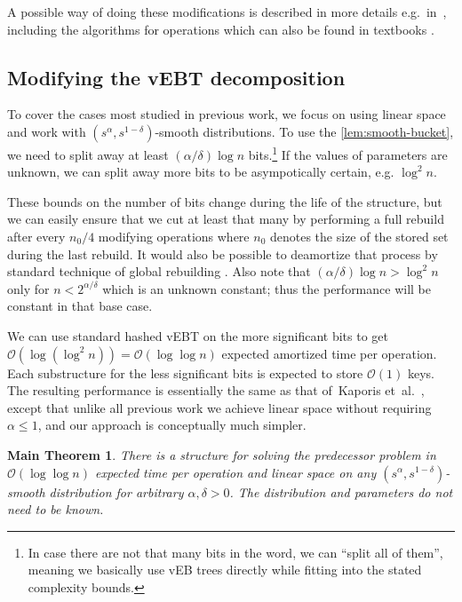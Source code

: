 \documentclass[
submission
]{dmtcs-episciences}
\theoremstyle{plain}
\theoremstyle{definition}
\theoremstyle{remark}
\theoremstyle{plain}
\theoremstyle{plain}
\newtheorem*{thm*}{Main Theorem}
\def\OO{\mathcal O}
\begin{document}
A possible way of doing these modifications is described in more details
e.g.~in~\cite[chapter 4]{Cunat10}, including the algorithms for
operations which can also be found in textbooks \cite[chapter 20]{intro2alg}.

\subsection{Modifying the vEBT decomposition}

To cover the cases most studied in previous work, we focus on using
linear space and work with $\left(s^{\alpha},s^{1-\delta}\right)$-smooth
distributions. To use the \ref{lem:smooth-bucket}, we need to split away at least
$(\alpha/\delta)\log n$ bits.\footnote{In case there are not that many bits in the word, we can ``split
all of them'', meaning we basically use vEB trees directly while
fitting into the stated complexity bounds.} If the values of parameters are unknown, we can split away more bits
to be asympotically certain, e.g. $\log^{2}n$.

These bounds on the number of bits change during the life of the structure,
but we can easily ensure that we cut at least that many by performing
a full rebuild after every $n_{0}/4$ modifying operations where $n_{0}$
denotes the size of the stored set during the last rebuild. It would
also be possible to deamortize that process by standard technique
of global rebuilding \cite{global-rebuilding}. Also note that $\left(\alpha/\delta\right)\log n>\log^{2}n$
only for $n<2^{\alpha/\delta}$ which is an unknown constant; thus
the performance will be constant in that base case.

We can use standard hashed vEBT on the more significant bits to get
$\OO\left(\log\left(\log^{2}n\right)\right)=\OO\left(\log\log n\right)$
expected amortized time per operation. Each substructure for the less
significant bits is expected to store $\OO(1)$ keys. The resulting
performance is essentially the same as that of~Kaporis et~al.~\cite{KMSTTZ06},
except that unlike all previous work we achieve linear space without
requiring $\alpha\le1$, and our approach is conceptually much simpler.
\begin{thm*}%
There is a structure for solving the predecessor problem in $\OO\left(\log\log n\right)$
expected time per operation and linear space on any $\left(s^{\alpha},s^{1-\delta}\right)$-smooth
distribution for arbitrary $\alpha,\delta>0$. The distribution and
parameters do not need to be known.
\end{thm*}
\end{document}
